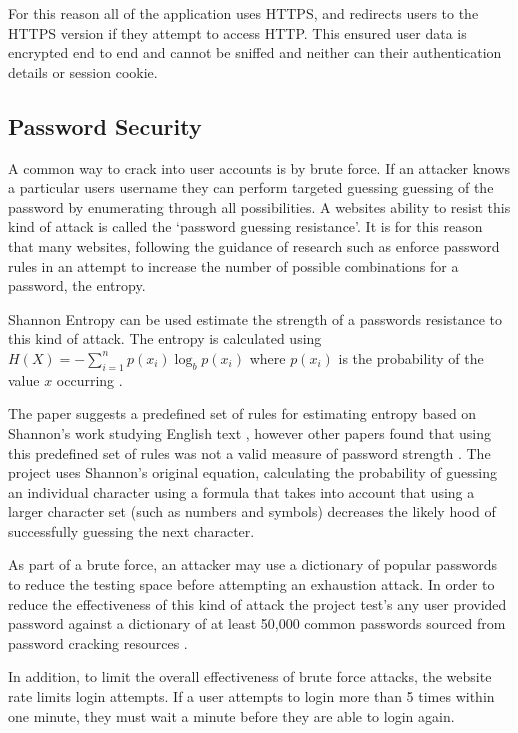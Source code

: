 For this reason all of the application uses HTTPS, and redirects users to the HTTPS version if they attempt to access HTTP. This ensured user data is encrypted end to end and cannot be sniffed and neither can their authentication details or session cookie.

\subsection{Password Security}

A common way to crack into user accounts is by brute force. If an attacker knows a particular users username they can perform targeted guessing guessing of the password by enumerating through all possibilities. A websites ability to resist this kind of attack is called the `password guessing resistance'. It is for this reason that many websites, following the guidance of research such as \cite{needed} enforce password rules in an attempt to increase the number of possible combinations for a password, the entropy.

Shannon Entropy can be used estimate the strength of a passwords resistance to this kind of attack. The entropy is calculated using $H(X)= - \sum_{i=1}^n{p(x_i)\log_b p(x_i)}$ where $p(x_i)$ is the probability of the value $x$ occurring \cite{burr2013electronic}.

The paper suggests a predefined set of rules for estimating entropy based on Shannon's work studying English text \cite{burr2013electronic}, however other papers found that using this predefined set of rules was not a valid measure of password strength \cite{weir2010shannon}.
% 
The project uses Shannon's original equation, calculating the probability of guessing an individual character using a formula that takes into account that using a larger character set (such as numbers and symbols) decreases the likely hood of successfully guessing the next character.

As part of a brute force, an attacker may use a dictionary of popular passwords to reduce the testing space before attempting an exhaustion attack. In order to reduce the effectiveness of this kind of attack the project test's any user provided password against a dictionary of at least 50,000 common passwords sourced from password cracking resources \cite{burr2013electronic}.

In addition, to limit the overall effectiveness of brute force attacks, the website rate limits login attempts. If a user attempts to login more than 5 times within one minute, they must wait a minute before they are able to login again.

